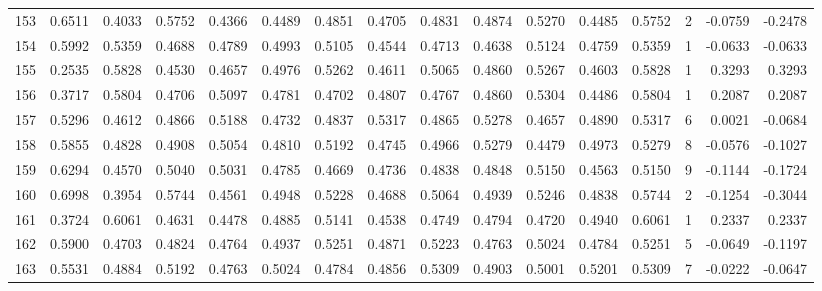\begin{tabular}{lrrrrrrrrrrrrrrr}
153 &      0.6511 &  0.4033 &  0.5752 &  0.4366 &  0.4489 &  0.4851 &  0.4705 &  0.4831 &  0.4874 &  0.5270 &   0.4485 &     0.5752 &      2 &                   -0.0759 &                    -0.2478 \\
154 &      0.5992 &  0.5359 &  0.4688 &  0.4789 &  0.4993 &  0.5105 &  0.4544 &  0.4713 &  0.4638 &  0.5124 &   0.4759 &     0.5359 &      1 &                   -0.0633 &                    -0.0633 \\
155 &      0.2535 &  0.5828 &  0.4530 &  0.4657 &  0.4976 &  0.5262 &  0.4611 &  0.5065 &  0.4860 &  0.5267 &   0.4603 &     0.5828 &      1 &                    0.3293 &                     0.3293 \\
156 &      0.3717 &  0.5804 &  0.4706 &  0.5097 &  0.4781 &  0.4702 &  0.4807 &  0.4767 &  0.4860 &  0.5304 &   0.4486 &     0.5804 &      1 &                    0.2087 &                     0.2087 \\
157 &      0.5296 &  0.4612 &  0.4866 &  0.5188 &  0.4732 &  0.4837 &  0.5317 &  0.4865 &  0.5278 &  0.4657 &   0.4890 &     0.5317 &      6 &                    0.0021 &                    -0.0684 \\
158 &      0.5855 &  0.4828 &  0.4908 &  0.5054 &  0.4810 &  0.5192 &  0.4745 &  0.4966 &  0.5279 &  0.4479 &   0.4973 &     0.5279 &      8 &                   -0.0576 &                    -0.1027 \\
159 &      0.6294 &  0.4570 &  0.5040 &  0.5031 &  0.4785 &  0.4669 &  0.4736 &  0.4838 &  0.4848 &  0.5150 &   0.4563 &     0.5150 &      9 &                   -0.1144 &                    -0.1724 \\
160 &      0.6998 &  0.3954 &  0.5744 &  0.4561 &  0.4948 &  0.5228 &  0.4688 &  0.5064 &  0.4939 &  0.5246 &   0.4838 &     0.5744 &      2 &                   -0.1254 &                    -0.3044 \\
161 &      0.3724 &  0.6061 &  0.4631 &  0.4478 &  0.4885 &  0.5141 &  0.4538 &  0.4749 &  0.4794 &  0.4720 &   0.4940 &     0.6061 &      1 &                    0.2337 &                     0.2337 \\
162 &      0.5900 &  0.4703 &  0.4824 &  0.4764 &  0.4937 &  0.5251 &  0.4871 &  0.5223 &  0.4763 &  0.5024 &   0.4784 &     0.5251 &      5 &                   -0.0649 &                    -0.1197 \\
163 &      0.5531 &  0.4884 &  0.5192 &  0.4763 &  0.5024 &  0.4784 &  0.4856 &  0.5309 &  0.4903 &  0.5001 &   0.5201 &     0.5309 &      7 &                   -0.0222 &                    -0.0647 \\

\end{tabular}
